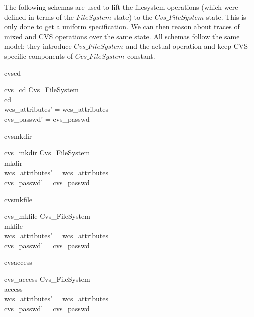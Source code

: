 The following schemas are used to lift the \unix{} filesystem operations (which
were defined in terms of the $FileSystem$ state) to the $Cvs\_FileSystem$ state.
This is only done to get a uniform specification.  We can then reason about
traces of mixed \unix{} and CVS operations over the same state.  All schemas
follow the same model: they introduce $Cvs\_FileSystem$ and the actual \unix{}
operation and keep CVS-specific components of $Cvs\_FileSystem$ constant.
\begin{zedgroup}
  \begin{doc}{cvscd}
    \begin{schema}{cvs\_cd}
      \Delta Cvs\_FileSystem\\
      cd \\
      \where
      wcs\_attributes' = wcs\_attributes \\
      cvs\_passwd' = cvs\_passwd \\ 
    \end{schema}
  \end{doc}
  \begin{doc}{cvsmkdir}
    \begin{schema}{cvs\_mkdir}
      \Delta Cvs\_FileSystem\\
      mkdir \\
      \where
      wcs\_attributes' = wcs\_attributes \\
      cvs\_passwd' = cvs\_passwd \\ 
    \end{schema}
  \end{doc}
  \begin{doc}{cvsmkfile}
    \begin{schema}{cvs\_mkfile}
      \Delta Cvs\_FileSystem\\
      mkfile \\
      \where
      wcs\_attributes' = wcs\_attributes \\
      cvs\_passwd' = cvs\_passwd \\ 
    \end{schema}
  \end{doc}
  \begin{doc}{cvsaccess}
    \begin{schema}{cvs\_access}
      \Delta Cvs\_FileSystem\\
      access \\
      \where
      wcs\_attributes' = wcs\_attributes \\
      cvs\_passwd' = cvs\_passwd \\ 
    \end{schema}

\end{doc}
\end{zedgroup}
